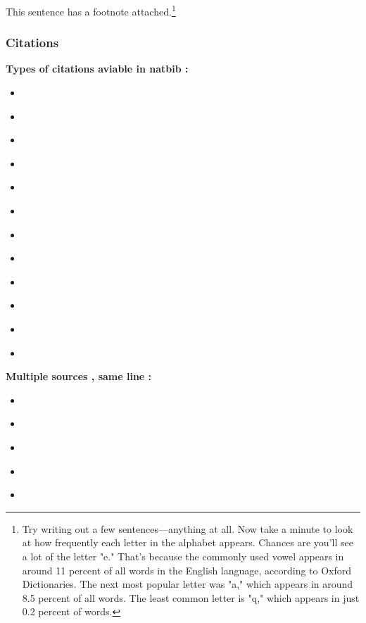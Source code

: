 \lipsum[1-2]

This sentence has a footnote attached.\footnote{Try writing out a few
	sentences—anything at all. Now take a minute to look at how frequently each
	letter in the alphabet appears.  Chances are you'll see a lot of the letter
	"e." That's because the commonly used vowel appears in around 11 percent of
	all words in the English language, according to Oxford Dictionaries. The
	next most popular letter was "a," which appears in around 8.5 percent of all
	words. The least common letter is "q," which appears in just 0.2 percent of
	words.}


\subsubsectionend

\vspace{0.5cm}

\subsubsection{Citations}
\label{sssec:citations}

\textbf{Types of citations aviable in natbib :}


\begin{itemize}[noitemsep]

	\item \cite{einstein}
	\item \citeauthor{einstein}
	\item \citeauthor*{einstein}
	\item \citeyear{einstein}
	\item \citeyearpar{einstein}
	\item \citet{einstein} 
	\item \citet*{einstein} 
	\item \citet[chap. ~2]{einstein} 
	\item \citep{einstein} 
	\item \citep*{einstein} 
	\item \citep[see][]{einstein} 
	\item \citep[see][chap. ~2]{einstein}

\end{itemize}


\textbf{Multiple sources , same line :}



\begin{itemize}[noitemsep]

	\item \cite{einstein,lipsum}
	\item \citet{einstein,lipsum}
	\item \citep{einstein,lipsum}
	\item \citet*{einstein,lipsum}
	\item \citep*{einstein,lipsum}

\end{itemize}

